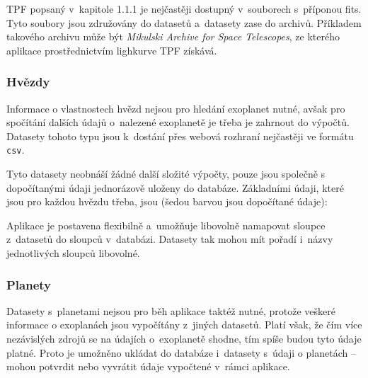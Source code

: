 \documentclass[a4paper,12pt]{article}
\def\code#1{\texttt{#1}}
\begin{document}
{{{{{{{{TPF popsaný v~kapitole 1.1.1 je nejčastěji dostupný v~souborech s~příponou fits. Tyto soubory jsou združovány do datasetů a~datasety zase do archivů. Příkladem takového archivu může být \textit{Mikulski Archive for Space Telescopes}, ze kterého aplikace prostřednictvím lighkurve TPF získává.

\subsubsection{Hvězdy}

Informace o vlastnostech hvězd nejsou pro hledání exoplanet nutné, avšak pro spočítání dalších údajů o~nalezené exoplanetě je třeba je zahrnout do výpočtů. Datasety tohoto typu jsou k~dostání přes webová rozhraní nejčastěji ve formátu \code{csv}.


Tyto datasety neobnáší žádné další složité výpočty, pouze jsou společně s dopočítanými údaji jednorázově uloženy do databáze. Základními údaji, které jsou pro každou hvězdu třeba, jsou (šedou barvou jsou dopočítané údaje):


Aplikace je postavena flexibilně a~umožňuje libovolně namapovat sloupce z~datasetů do sloupců v~databázi. Datasety tak mohou mít pořadí i~názvy jednotlivých sloupců libovolné.


\subsubsection{Planety}

Datasety s~planetami nejsou pro běh aplikace taktéž nutné, protože veškeré informace o exoplanách jsou vypočítány z~jiných datasetů. Platí však, že čím více nezávislých zdrojů se na údajích o~exoplanetě shodne, tím spíše budou tyto údaje platné. Proto je umožněno ukládat do databáze i~datasety s~údaji o planetách -- mohou potvrdit nebo vyvrátit údaje vypočtené v~rámci aplikace.

}}}}}}}}
\end{document}
